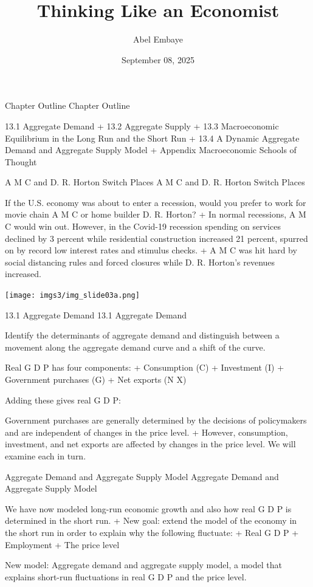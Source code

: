 \documentclass[
  12pt,
  ignorenonframetext,
]{beamer}
\title{Thinking Like an Economist}
\author{Abel Embaye}
\date{September 08, 2025}
\institute{Department of Economics\\
\strut \\
UofA\\}
\begin{document}
\frame{\titlepage}

\begin{frame}{Chapter Outline}
\protect\hypertarget{chapter-outline}{}
Chapter Outline

13.1 Aggregate Demand + 13.2 Aggregate Supply + 13.3 Macroeconomic
Equilibrium in the Long Run and the Short Run + 13.4 A Dynamic Aggregate
Demand and Aggregate Supply Model + Appendix Macroeconomic Schools of
Thought
\end{frame}

\begin{frame}{A M C and D. R. Horton Switch Places}
\protect\hypertarget{a-m-c-and-d.-r.-horton-switch-places}{}
A M C and D. R. Horton Switch Places

If the U.S. economy was about to enter a recession, would you prefer to
work for movie chain A M C or home builder D. R. Horton? + In normal
recessions, A M C would win out. However, in the Covid-19 recession
spending on services declined by 3 percent while residential
construction increased 21 percent, spurred on by record low interest
rates and stimulus checks. + A M C was hit hard by social distancing
rules and forced closures while D. R. Horton's revenues increased.

\texttt{[image: imgs3/img\_slide03a.png]}
\end{frame}

\begin{frame}{13.1 Aggregate Demand}
\protect\hypertarget{aggregate-demand}{}
13.1 Aggregate Demand

Identify the determinants of aggregate demand and distinguish between a
movement along the aggregate demand curve and a shift of the curve.

Real G D P has four components: + Consumption (C) + Investment (I) +
Government purchases (G) + Net exports (N X)

Adding these gives real G D P:

Government purchases are generally determined by the decisions of
policymakers and are independent of changes in the price level. +
However, consumption, investment, and net exports are affected by
changes in the price level. We will examine each in turn.
\end{frame}

\begin{frame}{Aggregate Demand and Aggregate Supply Model}
\protect\hypertarget{aggregate-demand-and-aggregate-supply-model}{}
Aggregate Demand and Aggregate Supply Model

We have now modeled long-run economic growth and also how real G D P is
determined in the short run. + New goal: extend the model of the economy
in the short run in order to explain why the following fluctuate: + Real
G D P + Employment + The price level

New model: Aggregate demand and aggregate supply model, a model that
explains short-run fluctuations in real G D P and the price level.
\end{frame}
\end{document}
